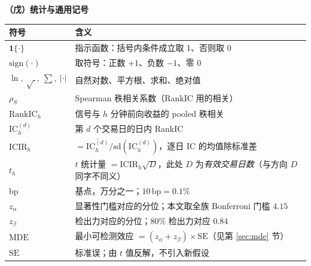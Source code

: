 \smallskip\noindent\textbf{（戊）统计与通用记号}
\nopagebreak
\begin{center}\footnotesize\setlength{\tabcolsep}{5pt}
\begin{tabular}{lp{11.2cm}}
\toprule
符号 & 含义 \\
\midrule
$\mathbf{1}\{\cdot\}$ & 指示函数：括号内条件成立取 1、否则取 0 \\
$\mathrm{sign}(\cdot)$ & 取符号：正数 $+1$、负数 $-1$、零 $0$ \\
$\ln,\ \sqrt{\ },\ \sum,\ |\cdot|$ & 自然对数、平方根、求和、绝对值 \\
$\rho_S$ & Spearman 秩相关系数（RankIC 用的相关） \\
$\mathrm{RankIC}_h$ & 信号与 $h$ 分钟前向收益的 pooled 秩相关 \\
$\mathrm{IC}^{(d)}_h$ & 第 $d$ 个交易日的日内 RankIC \\
$\mathrm{ICIR}_h$ & $=\overline{\mathrm{IC}^{(d)}_h}/\mathrm{sd}(\mathrm{IC}^{(d)}_h)$，逐日 IC 的均值除标准差 \\
$t_h$ & $t$ 统计量 $=\mathrm{ICIR}_h\sqrt{D}$，此处 $D$ 为\emph{有效交易日数}（与方向 $D$ 同字不同义） \\
$\mathrm{bp}$ & 基点，万分之一；$10\,\mathrm{bp}=0.1\%$ \\
$z_\alpha$ & 显著性门槛对应的分位；本文取全族 Bonferroni 门槛 $4.15$ \\
$z_\beta$ & 检出力对应的分位；$80\%$ 检出力对应 $0.84$ \\
$\mathrm{MDE}$ & 最小可检测效应 $=(z_\alpha+z_\beta)\times\mathrm{SE}$（见第 \ref{sec:mde} 节） \\
$\mathrm{SE}$ & 标准误；由 $t$ 值反解，不引入新假设 \\
\bottomrule
\end{tabular}
\end{center}
